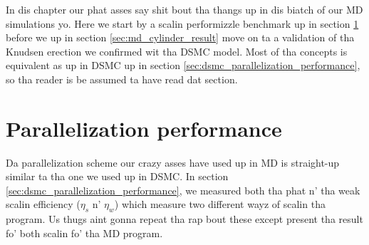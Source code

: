 In dis chapter our phat asses say shit bout tha thangs up in dis biatch of our MD simulations yo. Here we start by a scalin performizzle benchmark up in section \ref{sec:md_benchmark} before we up in section \ref{sec:md_cylinder_result} move on ta a validation of tha Knudsen erection we confirmed wit tha DSMC model. Most of tha concepts is equivalent as up in DSMC up in section \ref{sec:dsmc_parallelization_performance}, so tha reader is be assumed ta have read dat section.

\section{Parallelization performance}
\label{sec:md_benchmark}
Da parallelization scheme our crazy asses have used up in MD is straight-up similar ta tha one we used up in DSMC. In section \ref{sec:dsmc_parallelization_performance}, we measured both tha phat n' tha weak scalin efficiency ($\eta_s$ n' $\eta_w$) which measure two different wayz of scalin tha program. Us thugs aint gonna repeat tha rap bout these except present tha result fo' both scalin fo' tha MD program. 

